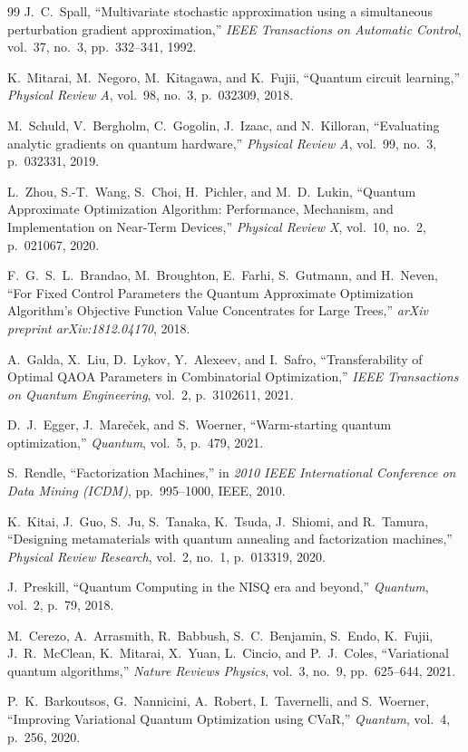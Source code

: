 \documentclass[11pt,a4paper,oneside,openany]{ltjsbook}
\theoremstyle{definition}
\theoremstyle{plain}
\theoremstyle{remark}
\begin{document}
\begin{thebibliography}{99}
J.~C.~Spall,
\newblock ``Multivariate stochastic approximation using a simultaneous perturbation gradient approximation,''
\newblock \textit{IEEE Transactions on Automatic Control}, vol.~37, no.~3, pp.~332--341, 1992.

K.~Mitarai, M.~Negoro, M.~Kitagawa, and K.~Fujii,
\newblock ``Quantum circuit learning,''
\newblock \textit{Physical Review A}, vol.~98, no.~3, p.~032309, 2018.

M.~Schuld, V.~Bergholm, C.~Gogolin, J.~Izaac, and N.~Killoran,
\newblock ``Evaluating analytic gradients on quantum hardware,''
\newblock \textit{Physical Review A}, vol.~99, no.~3, p.~032331, 2019.

L.~Zhou, S.-T.~Wang, S.~Choi, H.~Pichler, and M.~D.~Lukin,
\newblock ``Quantum Approximate Optimization Algorithm: Performance, Mechanism, and Implementation on Near-Term Devices,''
\newblock \textit{Physical Review X}, vol.~10, no.~2, p.~021067, 2020.

F.~G.~S.~L.~Brandao, M.~Broughton, E.~Farhi, S.~Gutmann, and H.~Neven,
\newblock ``For Fixed Control Parameters the Quantum Approximate Optimization Algorithm's Objective Function Value Concentrates for Large Trees,''
\newblock \textit{arXiv preprint arXiv:1812.04170}, 2018.

A.~Galda, X.~Liu, D.~Lykov, Y.~Alexeev, and I.~Safro,
\newblock ``Transferability of Optimal QAOA Parameters in Combinatorial Optimization,''
\newblock \textit{IEEE Transactions on Quantum Engineering}, vol.~2, p.~3102611, 2021.

D.~J.~Egger, J.~Mare{\v{c}}ek, and S.~Woerner,
\newblock ``Warm-starting quantum optimization,''
\newblock \textit{Quantum}, vol.~5, p.~479, 2021.

S.~Rendle,
\newblock ``Factorization Machines,''
\newblock in \textit{2010 IEEE International Conference on Data Mining (ICDM)}, pp.~995--1000, IEEE, 2010.

K.~Kitai, J.~Guo, S.~Ju, S.~Tanaka, K.~Tsuda, J.~Shiomi, and R.~Tamura,
\newblock ``Designing metamaterials with quantum annealing and factorization machines,''
\newblock \textit{Physical Review Research}, vol.~2, no.~1, p.~013319, 2020.

J.~Preskill,
\newblock ``Quantum Computing in the {NISQ} era and beyond,''
\newblock \textit{Quantum}, vol.~2, p.~79, 2018.

M.~Cerezo, A.~Arrasmith, R.~Babbush, S.~C.~Benjamin, S.~Endo, K.~Fujii, J.~R.~McClean, K.~Mitarai, X.~Yuan, L.~Cincio, and P.~J.~Coles,
\newblock ``Variational quantum algorithms,''
\newblock \textit{Nature Reviews Physics}, vol.~3, no.~9, pp.~625--644, 2021.

P.~K.~Barkoutsos, G.~Nannicini, A.~Robert, I.~Tavernelli, and S.~Woerner,
\newblock ``Improving Variational Quantum Optimization using {CVaR},''
\newblock \textit{Quantum}, vol.~4, p.~256, 2020.

\end{thebibliography}
\end{document}
